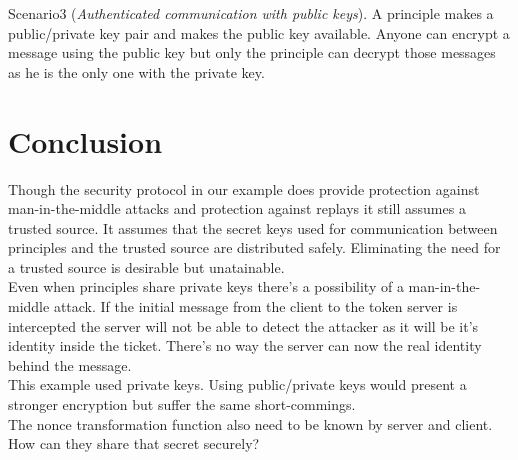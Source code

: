 Scenario3 (\textit{Authenticated communication with public keys}). A principle makes a public/private key pair and makes the public key available. Anyone can encrypt a message using the public key but only the principle can decrypt those messages as he is the only one with the private key. \\

 

  

\section{Conclusion}

Though the security protocol in our example does provide protection against man-in-the-middle attacks and protection against replays it still assumes a trusted source. It assumes that the secret keys used for communication between principles and the trusted source are distributed safely. Eliminating the need for a trusted source is desirable but unatainable. \\

Even when principles share private keys there's a possibility of a man-in-the-middle attack. If the initial message from the client to the token server is intercepted the server will not be able to detect the attacker as it will be it's identity inside the ticket. There's no way the server can now the real identity behind the message. \\ 

This example used private keys. Using public/private keys would present a stronger encryption but suffer the same short-commings. \\

The nonce transformation function also need to be known by server and client. How can they share that secret securely?















